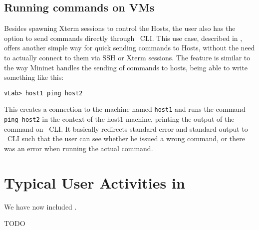 \subsection{Running commands on VMs}
\label{sub-sec:run-cmd}


Besides spawning Xterm sessions to control the Hosts, the user also has the option to send commands directly through \project\ CLI.
This use case, described in , offers another simple way for quick sending commands to Hosts, without the need to actually connect to them via SSH or Xterm sessions.
The feature is similar to the way Mininet handles the sending of commands to hosts, being able to write something like this:

\lstset{label=lst:ping-example}
\begin{lstlisting}
vLab> host1 ping host2
\end{lstlisting}

This creates a connection to the machine named \texttt{host1} and runs the command \texttt{ping host2} in the context of the host1 machine, printing the output of the command on \project\ CLI.
It basically redirects standard error and standard output to \project\ CLI such that the user can see whether he issued a wrong command, or there was an error when running the actual command.

\section{Typical User Activities in \project}


We have now included .

TODO
